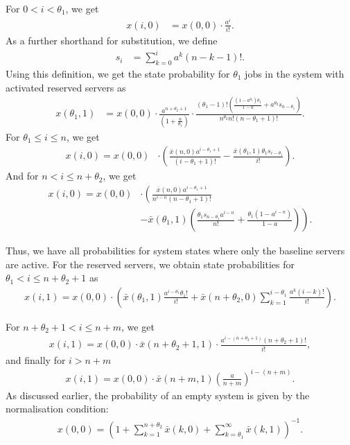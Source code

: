 For \(0 < i <\theta_1\), we get
\begin{align*}
x(i, 0) &= x(0, 0) \cdot \frac{a^i}{i!}.
\end{align*}
As a further shorthand for substitution, we define
\begin{align*}
s_i&=\sum_{k=0}^{i}a^k(n-k-1)!.
\end{align*}
Using this definition, we get the state probability for \(\theta_1\) jobs in the system with activated reserved servers as
\begin{align*}
x(\theta_1, 1) &= x(0, 0)\cdot \frac{a^{n+\theta_2+1}}{\left(1+\frac{a}{\theta_1}\right)}
\cdot\frac{\left(\theta_1-1\right)!\left(\frac{(1-a^{\theta_2})\theta_1}{1-a}+a^{\theta_2}s_{n-\theta_1}\right)}{n^{\theta_2}n!\left(n-\theta_1+1\right)!}.
\end{align*}
For \(\theta_1\leq i\leq n\), we get
\begin{align*}
x(i, 0) = x(0, 0) &\cdot \left(\frac{\bar{x}(n, 0) a^{i-\theta_1+1}}{(i-\theta_1+1)!} - \frac{\bar{x}(\theta_1,1) \theta_1 s_{i-\theta_1}}{i!}\right).
\end{align*}
And for \(n<i\leq n+\theta_2\), we get
\begin{align*}
x(i, 0) = x(0, 0) &\cdot \left(\frac{\bar{x}(n,0) a^{i-\theta_1+1}}{n^{i-n}(n-\theta_1+1)!}\right.\\
&\left.-\bar{x}(\theta_1,1)\left(\frac{\theta_1 s_{n-\theta_1} a^{i-n}}{n!} + \frac{\theta_1(1-a^{i-n})}{1-a}\right)\right).
\end{align*}

Thus, we have all probabilities for system states where only the baseline servers are active. For the reserved servers, we obtain state probabilities for \(\theta_1<i\leq n+\theta_2+1\) as
\begin{align*}
x(i, 1) = x(0, 0) \cdot \left(\bar{x}(\theta_1, 1)\frac{a^{i-\theta_1}\theta_1!}{i!} + \bar{x}(n+\theta_2,0)\sum_{k=1}^{i-\theta_1}\frac{a^k(i-k)!}{i!}\right).
\end{align*}

For \(n+\theta_2+1 < i \leq n + m\), we get
\begin{align*}
x(i, 1) = x(0, 0)\cdot \bar{x}(n+\theta_2+1,1) \cdot\frac{a^{i-(n+\theta_2+1)}(n+\theta_2+1)!}{i!},
\end{align*}
and finally for \(i>n+m\)
\begin{align*}
x(i, 1) = x(0, 0)\cdot \bar{x}(n+m,1) \left(\frac{a}{n+m}\right)^{i-(n+m)}.
\end{align*}
As discussed earlier, the probability of an empty system is given by the normalisation condition:
\begin{align*}
x(0, 0)=\left(1 +\sum_{k=1}^{n+\theta_2}\bar{x}(k, 0) + \sum_{k=\theta_1}^{\infty}\bar{x}(k,1)\right)^{-1}.
\end{align*}

